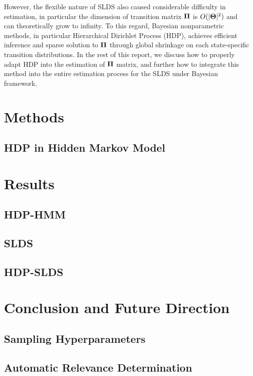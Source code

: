 \documentclass{article} %
\begin{document}
However, the flexible nature of SLDS also caused considerable difficulty in estimation, in particular the dimension of transition matrix $\boldsymbol{\Pi}$ is  $O(|\boldsymbol{\Theta}|^2)$ and can theoretically grow to infinity. To this regard, Bayesian nonparametric methods, in particular Hierarchical Dirichlet Process (HDP), achieves efficient inference and sparse solution to $\boldsymbol{\Pi}$ through global shrinkage on each state-specific transition distributions. In the rest of this report, we discuss how to properly adapt HDP into the estimation of $\boldsymbol{\Pi}$ matrix, and further how to integrate this method into the entire estimation process for the SLDS under Bayesian framework.


\section{Methods}

\subsection{HDP in Hidden Markov Model}



\section{Results}

\subsection{HDP-HMM}

\subsection{SLDS}

\subsection{HDP-SLDS}


\section{Conclusion and Future Direction}

\subsection{Sampling Hyperparameters}

\subsection{Automatic Relevance Determination}
\end{document}

